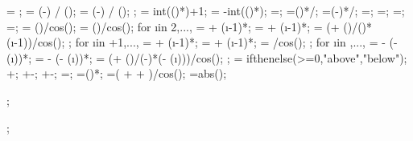 {{%
\loadarrownumbermo = ;
\arrlenratioleft = (\midratioleft-\loadstartratio) / (\arrforceratio);
\arrlenratioright = (\midratioright-\loadendratio) / (\arrforceratio);
;
\leftendarrno = int(()*\arrlenratioleft)+1;
\rightstartarrno = \loadarrownumber-int(()*\arrlenratioright);
\rightendarrno=\loadarrownumbermo;
\leftendarrratio=()*\loadwxvalue/\loaddxaleft;
\rightstartarrratio=(\loadarrownumber-\rightstartarrno)*\loadwxvalue/\loaddxaright;
\leftendarrdist=\leftendarrratio*\lenaleft;
\dahleftend=\leftendarrratio*\dahleft;
\rightstartarrdist=\rightstartarrratio*\lenaright;
\dahrightstart=\rightstartarrratio*\dahright;
 = (\loadarrowheightleft)/cos(\extraangle);
\loadarrowheight{\loadarrownumber} = (\loadarrowheightright)/cos(\extraangle);
for \i in {2,...,{\leftendarrno}}{
\loadxvalue{\i} =  + (\i-1)*\loadwxvalue;
\loadyvalue{\i} =  + (\i-1)*\loadwyvalue;
\loadarrowheight{\i} = (\loadarrowheightleft + (\dahleftend)/()*(\i-1))/cos(\extraangle);
};
for \i in {{\leftendarrno+1},...,{}}{
	\loadxvalue{\i} =  + (\i-1)*\loadwxvalue;
	\loadyvalue{\i} =  + (\i-1)*\loadwyvalue;
	\loadarrowheight{\i} = \loadarrowheightmid/cos(\extraangle);
};
for \i in {{\rightendarrno},...,{\rightstartarrno}}{
\loadxvalue{\i} = \loadxvalue{\loadarrownumber} - (\loadarrownumber - (\i))*\loadwxvalue;
\loadyvalue{\i} = \loadyvalue{\loadarrownumber} - (\loadarrownumber - (\i))*\loadwyvalue;
\loadarrowheight{\i} = (\loadarrowheightright + (\dahrightstart)/(\loadarrownumber-\rightstartarrno)*(\loadarrownumber - (\i)))/cos(\extraangle);
};
\loc = ifthenelse(\loadarrowheightleft>=0,"above","below");
+\loadangle;
+\loadangle-\extraangle;
+\loadangle-\extraangle;
\ninetya=\ninetyfac*\ninetydim;
\ninetyb=()*\ninetydim;
\totanglen=(\loadarrowheight{\drawanglei} + \angsp + \anglen)/cos(\extraangle);
\absextraangle=abs(\extraangle);
}


;

;

}
